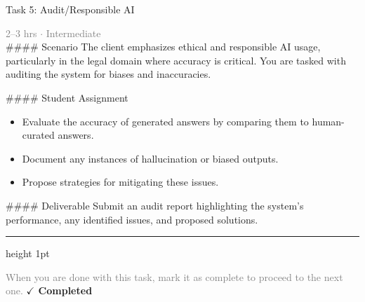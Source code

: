 \documentclass[10pt,a4paper]{article}
\begin{document}
\begin{taskbox}{Task 5: Audit/Responsible AI}

    {\small \textcolor{gray}{2--3 hrs $\cdot$ Intermediate}}\\[12pt]

    \#\#\#\# Scenario  
The client emphasizes ethical and responsible AI usage, particularly in the legal domain where accuracy is critical. You are tasked with auditing the system for biases and inaccuracies.  

\#\#\#\# Student Assignment  
\begin{itemize}
    \item Evaluate the accuracy of generated answers by comparing them to human-curated answers.  
    \item Document any instances of hallucination or biased outputs.  
    \item Propose strategies for mitigating these issues.  
\end{itemize}

\#\#\#\# Deliverable  
Submit an audit report highlighting the system’s performance, any identified issues, and proposed solutions.\par

    \vspace{16pt}

    \textcolor{cardBorder}{\hrule height 1pt}\vspace{8pt}

    \small \textcolor{gray}{When you are done with this task, mark it as complete to proceed to the next one.} \hfill \textbf{\textcolor{brandDark}{$\checkmark$ Completed}}

\end{taskbox}
\end{document}
